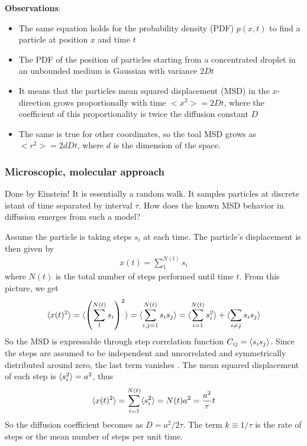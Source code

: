 %
\textbf{Observations}:
%
\begin{itemize}
\item The same equation holds for the probability density (PDF)
  $p(x,t)$ to find a particle at position $x$ and time $t$
\item The PDF of the position of particles starting from a
  concentrated droplet in an unbounded medium is Gaussian with
  variance $2Dt$
\item It means that the particles mean squared displacement (MSD) in
  the $x$-direction grows proportionally with time $<x^2> = 2Dt$,
  where the coefficient of this proportionality is twice the diffusion
  constant $D$
\item The same is true for other coordinates, so the toal MSD grows as
  $<r^2> = 2dD t$, where $d$ is the dimension of the space. 
\end{itemize}






\subsubsection{Microscopic, molecular approach}

Done by Einstein! It is essentially a random walk. It samples
particles at discrete istant of time separated by interval $\tau$. How
does the known MSD behavior in diffusion emerges from such a model?

Assume the particle is taking steps $s_i$ at each time. The particle's
displacement is then given by
%
\begin{align}
  x(t) = \sum_1^{N(t)} s_i
\end{align}
%
where $N(t)$ is the total number of steps performed until time
$t$. From this picture, we get
%
\begin{align}
  \langle x(t)^2 \rangle= \langle \left( \sum_1^{N(t)} s_i \right)^{2} \rangle = \langle \sum_{i,j = 1}^{N(t)} s_i s_j \rangle = \langle \sum_{i =1}^{N(t)} s_i^2 \rangle + \langle \sum_{i\neq j} s_i s_j\rangle 
\end{align}
%
So the MSD is expressable through step correlation function $C_{ij} =
\langle s_i s_{j }\rangle $. Since the steps are assumed to be independent and
uncorrelated and symmetrically distributed around zero, the last term
vanishes . The mean squared displacement of each step is $\langle s_i^2
\rangle  = a^2$, thus
%
\begin{align}
  \langle x(t) ^2 \rangle = \sum_{i=1}^{N(t)} \langle s_i^2\rangle  = N(t) a^2 = \frac{a^{2}}{\tau} t
\end{align}
%
So the diffusion coefficient becomes as $D = a^2/2\tau$. The term $k
\equiv 1/\tau$ is the rate of steps or the mean number of steps per
unit time.


